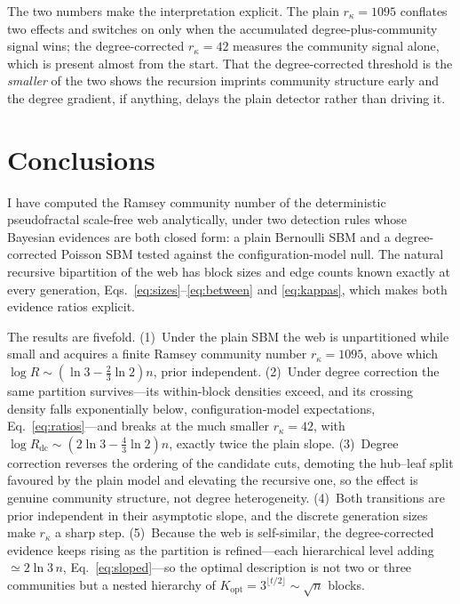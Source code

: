 \documentclass[aps,pre,twocolumn,superscriptaddress,floatfix,nofootinbib]{revtex4-2}
\begin{document}
The two numbers make the interpretation explicit. The plain
$r_\kappa=1095$ conflates two effects and switches on only when the accumulated
degree-plus-community signal wins; the degree-corrected $r_\kappa=42$ measures
the community signal alone, which is present almost from the start. That the
degree-corrected threshold is the \emph{smaller} of the two shows the recursion
imprints community structure early and the degree gradient, if anything, delays
the plain detector rather than driving it.

\section{Conclusions}
\label{sec:conclusions}

I have computed the Ramsey community number of the deterministic pseudofractal
scale-free web analytically, under two detection rules whose Bayesian evidences
are both closed form: a plain Bernoulli SBM and a degree-corrected Poisson SBM
tested against the configuration-model null. The natural recursive bipartition
of the web has block sizes and edge counts known exactly at every generation,
Eqs.~\eqref{eq:sizes}--\eqref{eq:between} and \eqref{eq:kappas}, which makes
both evidence ratios explicit.

The results are fivefold. (1)~Under the plain SBM the web is unpartitioned while
small and acquires a finite Ramsey community number $r_\kappa=1095$, above which
$\log R\sim(\ln 3-\tfrac23\ln 2)n$, prior independent. (2)~Under degree
correction the same partition survives---its within-block densities exceed, and
its crossing density falls exponentially below, configuration-model
expectations, Eq.~\eqref{eq:ratios}---and breaks at the much smaller
$r_\kappa=42$, with $\log R_{\mathrm{dc}}\sim(2\ln 3-\tfrac43\ln 2)n$, exactly
twice the plain slope. (3)~Degree correction reverses the ordering of the
candidate cuts, demoting the hub--leaf split favoured by the plain model and
elevating the recursive one, so the effect is genuine community structure, not
degree heterogeneity. (4)~Both transitions are prior independent in their
asymptotic slope, and the discrete generation sizes make $r_\kappa$ a sharp step.
(5)~Because the web is self-similar, the degree-corrected evidence keeps rising
as the partition is refined---each hierarchical level adding $\simeq2\ln 3\,n$,
Eq.~\eqref{eq:sloped}---so the optimal description is not two or three
communities but a nested hierarchy of
$K_{\mathrm{opt}}=3^{\lfloor t/2\rfloor}\sim\sqrt{n}$ blocks.
\end{document}
